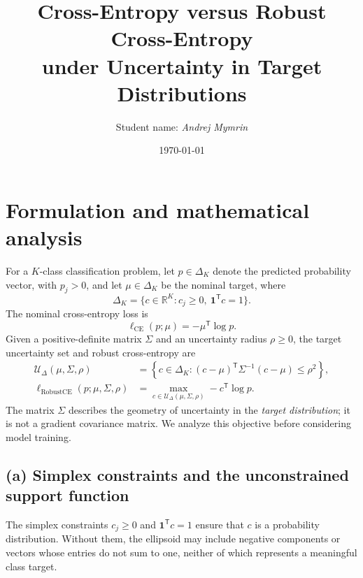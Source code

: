 \documentclass[11pt,a4paper]{article}
\title{Cross-Entropy versus Robust Cross-Entropy\\under Uncertainty in Target Distributions}
\author{Student name: \textit{Andrej Mymrin}}
\date{\today}
\newcommand{\R}{\mathbb{R}}
\newcommand{\CE}{\mathrm{CE}}
\newcommand{\RCE}{\mathrm{RobustCE}}
\newcommand{\UU}{\mathcal{U}_{\Delta}}
\begin{document}
\maketitle

\section{Formulation and mathematical analysis}
For a $K$-class classification problem, let $p\in\Delta_K$ denote the predicted
probability vector, with $p_j>0$, and let $\mu\in\Delta_K$ be the nominal target,
where
\begin{equation}
    \Delta_K=\bigl\{c\in\R^K:c_j\geq 0,\ \bm{1}^{\mathsf T}c=1\bigr\}.
\end{equation}
The nominal cross-entropy loss is
\begin{equation}
    \ell_{\CE}(p;\mu)=-\mu^{\mathsf T}\log p.
\end{equation}
Given a positive-definite matrix $\Sigma$ and an uncertainty radius $\rho\geq 0$,
the target uncertainty set and robust cross-entropy are
\begin{align}
    \UU(\mu,\Sigma,\rho)
      &=\left\{c\in\Delta_K:(c-\mu)^{\mathsf T}\Sigma^{-1}(c-\mu)
                  \leq\rho^2\right\},\\
    \ell_{\RCE}(p;\mu,\Sigma,\rho)
      &=\max_{c\in\UU(\mu,\Sigma,\rho)}-c^{\mathsf T}\log p.
\end{align}
The matrix $\Sigma$ describes the geometry of uncertainty in the \emph{target
distribution}; it is not a gradient covariance matrix. We analyze this objective
before considering model training.

\subsection*{(a) Simplex constraints and the unconstrained support function}
The simplex constraints $c_j\geq 0$ and $\bm{1}^{\mathsf T}c=1$ ensure that
$c$ is a probability distribution. Without them, the ellipsoid may include
negative components or vectors whose entries do not sum to one, neither of
which represents a meaningful class target.
\end{document}
